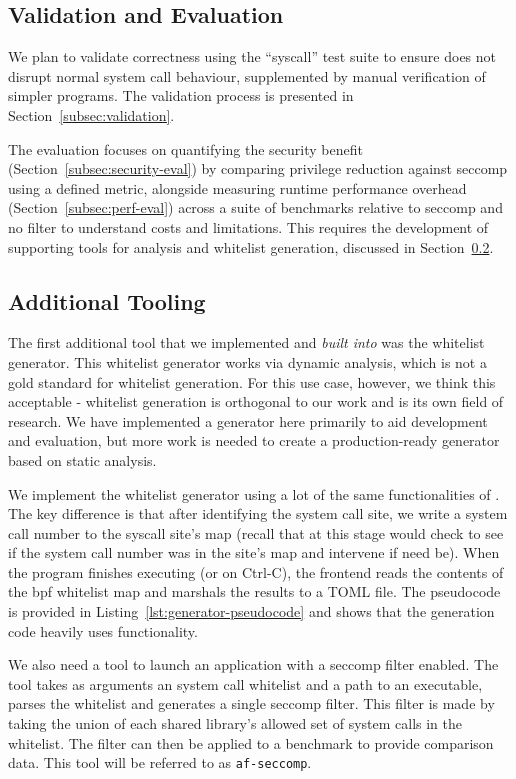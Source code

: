 \subsection{Validation and Evaluation}

We plan to validate correctness using the  ``syscall'' test
suite to ensure \af does not disrupt normal system call behaviour, supplemented
by manual verification of simpler programs. The validation process is presented
in Section~\ref{subsec:validation}.

The evaluation focuses on quantifying the security benefit
(Section~\ref{subsec:security-eval}) by comparing privilege reduction
against seccomp using a defined metric, alongside measuring runtime
performance overhead (Section~\ref{subsec:perf-eval}) across a suite of
benchmarks relative to seccomp and no filter to understand costs and
limitations. This requires the development of supporting tools for analysis
and whitelist generation, discussed in 
Section~\ref{subsubsec:additional-tooling}.

\subsection{Additional Tooling}\label{subsubsec:additional-tooling}

The first additional tool that we implemented and \textit{built into \af} was
the whitelist generator. This whitelist generator works via dynamic analysis,
which is not a gold standard for whitelist generation. For this use case,
however, we think this acceptable - whitelist generation is orthogonal to our
work and is its own field of research. We have implemented a generator here
primarily to aid development and evaluation, but more work is needed to create a
production-ready generator based on static analysis.

We implement the whitelist generator using a lot of the same functionalities of
\af. The key difference is that after identifying the system call site, we write a
system call number to the syscall site's map (recall that at this stage \af would
check to see if the system call number was in the site's map and intervene if need
be). When the program finishes executing (or on Ctrl-C), the frontend reads the
contents of the \ac{bpf} whitelist map and marshals the results to a TOML file.
The pseudocode is provided in Listing~\ref{lst:generator-pseudocode} and shows
that the generation code heavily uses \afg functionality.

We also need a tool to launch an application with a seccomp filter enabled.
The tool takes as arguments an \af system call whitelist
and a path to an executable, parses the whitelist and generates a single
seccomp filter. This filter is made by taking the union of each shared 
library's allowed set of system calls in the \af whitelist. The filter can
then be applied to a benchmark to provide comparison data. This tool will be
referred to as \texttt{af-seccomp}.

